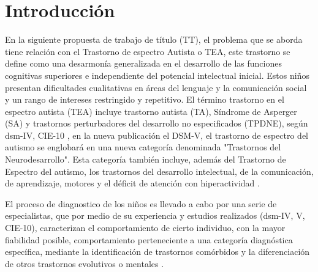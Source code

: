 \documentclass[12pt,letterpaper]{article}
\begin{document}
\newpage

\tableofcontents
\newpage

\listoftables
\listoffigures
\newpage



\section{Introducci\'on}
\label{intr}


En la siguiente propuesta de trabajo de t\'itulo (TT), el problema que se aborda 
tiene relaci\'on con el Trastorno de espectro Autista o TEA, este trastorno se 
define como una desarmon\'ia generalizada en el desarrollo de las funciones 
cognitivas superiores e independiente del potencial intelectual inicial. 
Estos ni\~nos presentan dificultades cualitativas en \'areas del lenguaje y 
la comunicaci\'on social y un rango de intereses restringido y repetitivo. 
El t\'ermino trastorno en el espectro autista (TEA) incluye trastorno autista 
(TA), S\'indrome de Asperger (SA) y trastornos perturbadores del desarrollo 
no especificados (TPDNE), seg\'un dsm-IV, CIE-10 \cite{REF2} \cite{REF6} \cite{REF7}, 
en la nueva publicaci\'on el DSM-V, el trastorno de espectro del autismo se englobar\'a 
en una nueva categor\'ia denominada "Trastornos del Neurodesarrollo". 
Esta categor\'ia tambi\'en incluye, adem\'as del Trastorno de Espectro del 
autismo, los trastornos del desarrollo intelectual, de la comunicaci\'on, 
de aprendizaje, motores y el d\'eficit de atenci\'on con hiperactividad \cite{REF3}.

El proceso de diagnostico de los ni\~nos es llevado a cabo por una serie de 
especialistas, que por medio de su experiencia y estudios realizados (dsm-IV, V, CIE-10),
 caracterizan el comportamiento de cierto individuo, con la mayor 
 fiabilidad posible, comportamiento perteneciente a una categor\'ia 
 diagn\'ostica espec\'ifica, mediante la identificaci\'on de trastornos 
 com\'orbidos y la diferenciaci\'on de otros trastornos evolutivos o 
 mentales \cite{REF4}.
\end{document}
